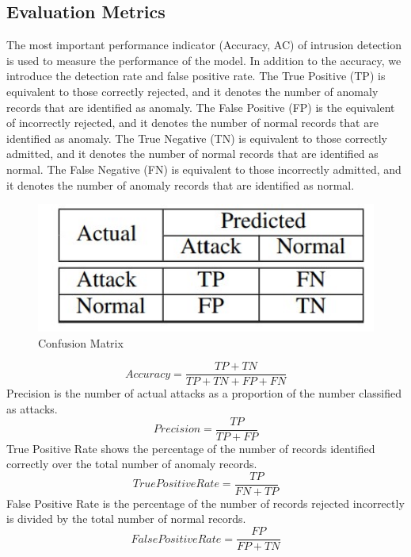 \subsection{Evaluation Metrics}
\vspace{-18pt}
The most important performance indicator (Accuracy, AC) of intrusion detection is used to measure the performance of the model. In addition to the accuracy, we introduce the detection rate and false positive rate. The True Positive (TP) is equivalent to those correctly rejected, and it denotes the number of anomaly records that are identified as anomaly. The False Positive (FP) is the equivalent of incorrectly rejected, and it denotes the number of normal records that are identified as anomaly. The True Negative (TN) is equivalent to those correctly admitted, and it denotes the number of normal records that are identified as normal. The False Negative (FN) is equivalent to those incorrectly admitted, and it denotes the number of anomaly records that are identified as normal.
\begin{figure}[tbh] %
\begin{center}
	\includegraphics[width=6in]{images/cm1.jpg} 
	\caption{Confusion Matrix} %
	\label{Confusion Matrix} %
\end{center}
\end{figure}
\begin{equation}
Accuracy = \frac{TP + TN}{TP + TN + FP + FN}
\end{equation} 
Precision is the number of actual attacks as a proportion of the number classified as attacks.
\begin{equation}
Precision = \frac{TP}{TP + FP} 
\end{equation}
True Positive Rate shows the percentage of the number of records identified correctly over the total number of anomaly records.
\begin{equation}
True Positive Rate = \frac{TP}{FN + TP}
\end{equation}
False Positive Rate is the percentage of the number of records rejected incorrectly is divided by the total number of normal records.
\begin{equation}
False Positive Rate = \frac{FP}{FP + TN}
\end{equation}
